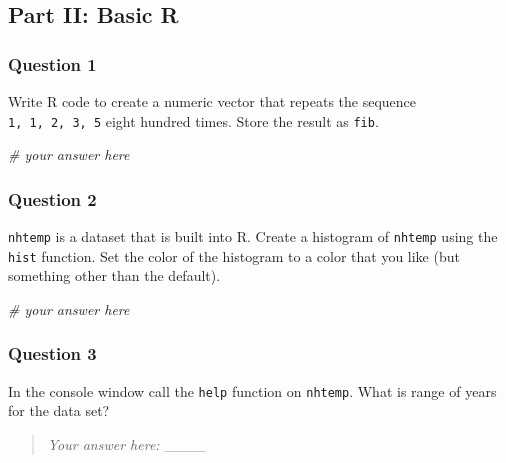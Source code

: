 \documentclass[
]{article}
\newenvironment{Shaded}{\begin{snugshade}}{\end{snugshade}}
\newcommand{\CommentTok}[1]{\textcolor[rgb]{0.56,0.35,0.01}{\textit{#1}}}
\begin{document}
\newpage

\hypertarget{part-ii-basic-r}{%
\subsection{Part II: Basic R}\label{part-ii-basic-r}}

\hypertarget{question-1}{%
\subsubsection{Question 1}\label{question-1}}

Write R code to create a numeric vector that repeats the sequence
\texttt{1,\ 1,\ 2,\ 3,\ 5} eight hundred times. Store the result as
\texttt{fib}.

\begin{Shaded}
\begin{Highlighting}[]
\CommentTok{\# your answer here}
\end{Highlighting}
\end{Shaded}

\newpage

\hypertarget{question-2}{%
\subsubsection{Question 2}\label{question-2}}

\texttt{nhtemp} is a dataset that is built into R. Create a histogram of
\texttt{nhtemp} using the \texttt{hist} function. Set the color of the
histogram to a color that you like (but something other than the
default).

\begin{Shaded}
\begin{Highlighting}[]
\CommentTok{\# your answer here}
\end{Highlighting}
\end{Shaded}

\newpage

\hypertarget{question-3}{%
\subsubsection{Question 3}\label{question-3}}

In the console window call the \texttt{help} function on
\texttt{nhtemp}. What is range of years for the data set?

\begin{quote}
\emph{Your answer here:} \_\_\_\_
\end{quote}
\end{document}
